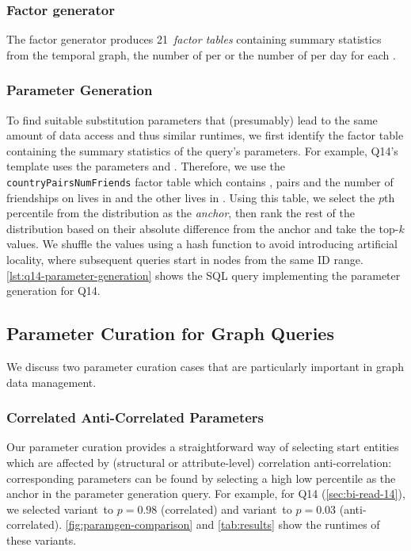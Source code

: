 \subsubsection*{Factor generator}
The factor generator produces 21~\emph{factor tables} containing summary statistics from the temporal graph,
\eg
the number of \tPersons per \tCity
or
the number of \tMessages per day for each \tTag.


\subsubsection*{Parameter Generation}
\label{sec:parameter-generation-query}

To find suitable substitution parameters that (presumably) lead to the same amount of data access and thus similar runtimes,
we first identify the factor table containing the summary statistics of the query's parameters.
For example, Q14's template uses the parameters \tCountry {} and \tCountry {}.
Therefore, we use the \texttt{countryPairsNumFriends} factor table which contains ,  pairs and the number of friendships on \tPerson lives in  and the other lives in .
Using this table, we select the $p$th percentile from the distribution as the \emph{anchor},
then rank the rest of the distribution based on their absolute difference from the anchor and take the top-$k$ values.
We shuffle the values using a hash function to avoid introducing artificial locality, where \eg subsequent queries start in nodes from the same ID range.
\autoref{lst:q14-parameter-generation} shows the SQL query implementing the parameter generation for Q14\variantA.

\subsection{Parameter Curation for Graph Queries}

We discuss two parameter curation cases that are particularly important in graph data management.

\subsubsection{Correlated \vs Anti-Correlated Parameters}
\label{sec:paramgen-correlations}

Our parameter curation provides a straightforward way of selecting start entities which
are affected by (structural or attribute-level) correlation \vs anti-correlation:
corresponding parameters can be found by selecting a high \vs low percentile as the anchor
in the parameter generation query.
For example, for Q14 (\autoref{sec:bi-read-14}),
we selected
variant~\variantA to $p=0.98$ (correlated) and
variant~\variantB to $p=0.03$ (anti-correlated).
\autoref{fig:paramgen-comparison} and \autoref{tab:results} show the runtimes of these variants.

